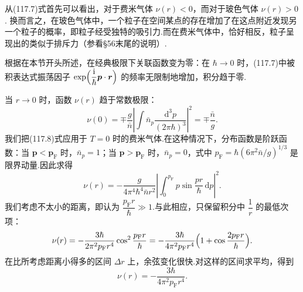 从(117.7)式首先可以看出，对于费米气体 $\nu(r)<0$，而对于玻色气体 $\nu(r)>0$.
换而言之，在玻色气体中，一个粒子在空间某点的存在增加了在这点附近发现另一个粒子的概率，即粒子经受独特的吸引力.而在费米气体中，恰好相反，粒子呈现出的类似于排斥力（参看§56末尾的说明）.

根据在本节开头所述，在经典极限下关联函数变为零：在 $\hbar\to0$ 时，(117.7)中被积表达式振荡因子
$\exp\Bigl(\dfrac{\mathrm{i}}{\hbar}\boldsymbol{p}\cdot\boldsymbol{r}\Bigr)$
的频率无限制地增加，积分趋于零.

当 $r\to0$ 时，函数 $\nu(r)$ 趋于常数极限：
\begin{equation}
  \nu(0)=\mp\frac{g}{\bar{n}}
  \left|\int\bar{n}_{p}\frac{\mathrm{d}^{3}p}{(2\pi\hbar)^{3}}\right|^{2}
  =\mp\frac{\bar{n}}{g}.
\end{equation}
我们把(117.8)式应用于 $T=0$ 时的费米气体.在这种情况下，分布函数是阶跃函数：当
$\boldsymbol{p}<\boldsymbol{p}_{\mathrm F}$ 时，$\bar{n}_{p}=1$；当
$\boldsymbol{p}>\boldsymbol{p}_{\mathrm F}$ 时，$\bar{n}_{p}=0$，式中
$p_{\mathrm F}=\hbar(6\pi^{2}\bar{n}/g)^{1/3}$ 是限界动量.因此求得
\begin{equation*}
  \nu(r)=-\frac{g}{4\pi^{4}\hbar^{4}\bar{n}r^{2}}
  \left|\int_{0}^{p_{\mathrm F}}p\sin\frac{pr}{\hbar}\,\mathrm{d}p\right|^{2}.
\end{equation*}
我们考虑不太小的距离，即认为 $\dfrac{p_{\mathrm F}r}{\hbar}\gg1$.与此相应，只保留积分中
$\dfrac{1}{r}$ 的最低次项：
\begin{equation}
  \nu(r)=-\frac{3\hbar}{2\pi^{2}p_{\mathrm F}r^{4}}
  \cos^{2}\frac{p_{\mathrm F}r}{\hbar}
  =-\frac{3\hbar}{4\pi^{2}p_{\mathrm F}r^{4}}
  \Bigl(1+\cos\frac{2p_{\mathrm F}r}{\hbar}\Bigr).
\end{equation}
在比所考虑距离小得多的区间 $\Delta r$ 上，余弦变化很快.对这样的区间求平均，得到
\begin{equation}
  \nu(r)=-\frac{3\hbar}{4\pi^{2}p_{\mathrm F}r^{4}}.
\end{equation}

